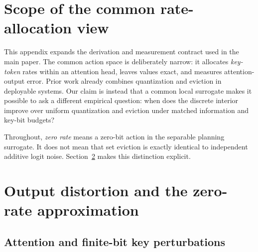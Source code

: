 \section{Scope of the common rate-allocation view}
\label{app:scope}

This appendix expands the derivation and measurement contract used in the main
paper.  The common action space is deliberately narrow: it allocates
\emph{key-token} rates within an attention head, leaves values exact, and measures
attention-output error.  Prior work already combines quantization and eviction
in deployable systems.  Our claim is instead that a common local surrogate makes
it possible to ask a different empirical question: when does the discrete
interior improve over uniform quantization and eviction under matched
information and key-bit budgets?

Throughout, \emph{zero rate} means a zero-bit action in the separable planning
surrogate.  It does not mean that set eviction is exactly identical to
independent additive logit noise.  Section~\ref{app:derivation} makes this
distinction explicit.

\section{Output distortion and the zero-rate approximation}
\label{app:derivation}

\subsection{Attention and finite-bit key perturbations}


